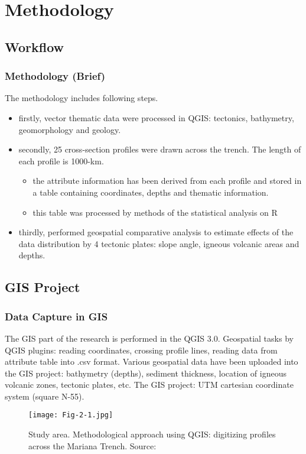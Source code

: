 \documentclass[pdflatex,compress,8pt,
	xcolor={dvipsnames,dvipsnames,svgnames,x11names,table},
	hyperref={colorlinks = true,breaklinks = true, urlcolor = NavyBlue, breaklinks = true}]{beamer}
\begin{document}

\section{Methodology}

\subsection{Workflow}
\begin{frame}
\frametitle{Methodology (Brief)}
The methodology includes following steps. 
\begin{itemize}
    \item<1-> firstly, vector thematic data were processed in QGIS: tectonics, bathymetry, geomorphology and geology.
    \item<2-> secondly, 25 cross-section profiles were drawn across the trench. The length of each profile is 1000-km. 
        \begin{itemize}
            \item the attribute information has been derived from each profile and stored in a table containing coordinates, depths and thematic information.
            \item this table was processed by methods of the statistical analysis on R
        \end{itemize}
      \item<3-> thirdly, performed geospatial comparative analysis to estimate effects of the data distribution by 4 tectonic plates: slope angle, igneous volcanic areas and depths.
\end{itemize}
\end{frame}

\subsection{GIS Project}
\begin{frame}
\frametitle{Data Capture in GIS}
			
The GIS part of the research is performed in the QGIS 3.0. 
Geospatial tasks by QGIS plugins: reading coordinates, crossing profile lines, reading data from attribute table into .csv format. Various geospatial data have been uploaded into the GIS project: bathymetry (depths), sediment thickness, location of igneous volcanic zones, tectonic plates, etc. The GIS project: UTM cartesian coordinate system (square N-55). 
\begin{figure}[H]
	\centering
		\texttt{[image: Fig-2-1.jpg]}
	\caption{Study area. Methodological approach using QGIS: digitizing profiles across the Mariana Trench. Source: \cite{Lemenkova201991}}\label{fig:2-1}
\end{figure}		
\end{frame}
\end{document}
